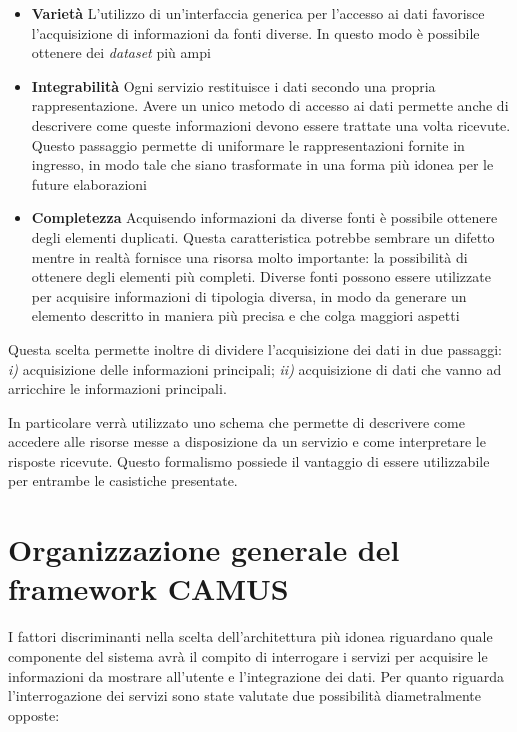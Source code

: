 \begin{itemize}
	\item \textbf{Varietà}
	L'utilizzo di un'interfaccia generica per l'accesso ai dati favorisce l'acquisizione di informazioni da fonti diverse. In questo modo è possibile ottenere dei \emph{dataset} più ampi
	\item \textbf{Integrabilità}
	Ogni servizio restituisce i dati secondo una propria rappresentazione. Avere un unico metodo di accesso ai dati permette anche di descrivere come queste informazioni devono essere trattate una volta ricevute. Questo passaggio permette di uniformare le rappresentazioni fornite in ingresso, in modo tale che siano trasformate in una forma più idonea per le future elaborazioni
	\item \textbf{Completezza}
	Acquisendo informazioni da diverse fonti è possibile ottenere degli elementi duplicati. Questa caratteristica potrebbe sembrare un difetto mentre in realtà fornisce una risorsa molto importante: la possibilità di ottenere degli elementi più completi. Diverse fonti possono essere utilizzate per acquisire informazioni di tipologia diversa, in modo da generare un elemento descritto in maniera più precisa e che colga maggiori aspetti
\end{itemize}

Questa scelta permette inoltre di dividere l'acquisizione dei dati in due passaggi: \emph{i)} acquisizione delle informazioni principali; \emph{ii)} acquisizione di dati che vanno ad arricchire le informazioni principali. 

In particolare verrà utilizzato uno schema che permette di descrivere come accedere alle risorse messe a disposizione da un servizio e come interpretare le risposte ricevute. Questo formalismo possiede il vantaggio di essere utilizzabile per entrambe le casistiche presentate.

\section{Organizzazione generale del framework CAMUS\label{sec:architettura-sistema}}

I fattori discriminanti nella scelta dell'architettura più idonea riguardano quale componente del sistema avrà il compito di interrogare i servizi per acquisire le informazioni da mostrare all'utente e l'integrazione dei dati.
Per quanto riguarda l'interrogazione dei servizi sono state valutate due possibilità diametralmente opposte:

